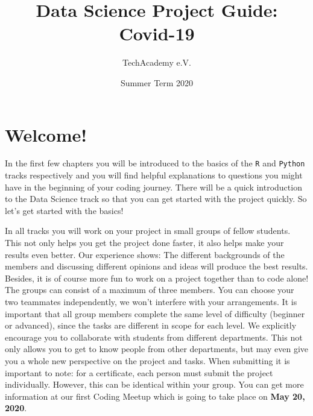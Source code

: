 \documentclass[
  11pt,
]{article}
\title{Data Science Project Guide: Covid-19}
\author{TechAcademy e.V.}
\date{Summer Term 2020}
\begin{document}
\maketitle

\clearpage

\addtolength{\headheight}{17.82275pt}

\fancyfoot{}
\fancyfoot[R]{\thepage}
\addtolength{\headheight}{17.82275pt}


\renewcommand{\headrulewidth}{0.25pt}
\renewcommand{\footrulewidth}{0.25pt}

\tableofcontents
\clearpage

\hypertarget{welcome}{%
\section{Welcome!}\label{welcome}}

In the first few chapters you will be introduced to the basics of the \texttt{R} and \texttt{Python} tracks respectively and you will find helpful explanations to questions you might have in the beginning of your coding journey. There will be a quick introduction to the Data Science track so that you can get started with the project quickly. So let's get started with the basics!

In all tracks you will work on your project in small groups of fellow students. This not only helps you get the project done faster, it also helps make your results even better. Our experience shows: The different backgrounds of the members and discussing different opinions and ideas will produce the best results. Besides, it is of course more fun to work on a project together than to code alone!\\
The groups can consist of a maximum of three members. You can choose your two teammates independently, we won't interfere with your arrangements. It is important that all group members complete the same level of difficulty (beginner or advanced), since the tasks are different in scope for each level. We explicitly encourage you to collaborate with students from different departments. This not only allows you to get to know people from other departments, but may even give you a whole new perspective on the project and tasks.
When submitting it is important to note: for a certificate, each person must submit the project individually. However, this can be identical within your group. You can get more information at our first Coding Meetup which is going to take place on \textbf{May 20, 2020}.
\end{document}
